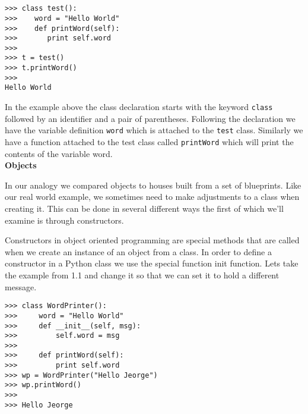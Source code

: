 \documentclass[letterpaper,11pt]{article}
\begin{document}
\\ \\
\begin{minipage}{.5\textwidth}
    \begin{tcolorbox}
        \begin{footnotesize}
            \begin{verbatim}
>>> class test():
>>>    word = "Hello World"
>>>    def printWord(self):
>>>       print self.word
>>>
>>> t = test()
>>> t.printWord()
>>>
Hello World
            \end{verbatim}
        \end{footnotesize}
    \end{tcolorbox}
\end{minipage}
\par{In the example above the class declaration starts with the keyword
\texttt{class} followed by an identifier and a pair of parentheses. Following
the declaration we have the variable definition \texttt{word} which is
attached to the \texttt{test} class. Similarly we have a function attached to the
test class called \texttt{printWord} which will print the contents of the
variable word.}
\\
\textbf{Objects}
\par{In our analogy we compared objects to houses built from a set of
blueprints.  Like our real world example, we sometimes need to make adjustments
to a class when creating it. This can be done in several different ways the
first of which we'll examine is through constructors.}
\par{Constructors in object oriented programming are special methods that are
    called when we create an instance of an object from a class. In order to
    define a constructor in a Python class we use the special function init
    function.  Lets take the example from 1.1 and change it so that we can set
it to hold a different message.}
\\
\begin{minipage}{.5\textwidth}
    \begin{tcolorbox}
        \begin{footnotesize}
            \begin{verbatim}
>>> class WordPrinter():
>>>     word = "Hello World"
>>>     def __init__(self, msg):
>>>         self.word = msg
>>>
>>>     def printWord(self):
>>>         print self.word
>>> wp = WordPrinter("Hello Jeorge")
>>> wp.printWord()
>>>
>>> Hello Jeorge
            \end{verbatim}
        \end{footnotesize}
    \end{tcolorbox}
\end{minipage}
\end{document}
